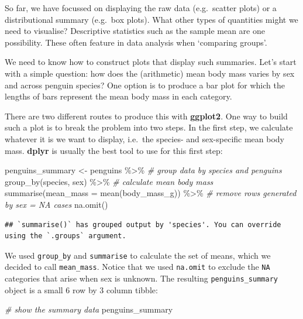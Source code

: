 \documentclass[
]{book}
\newenvironment{Shaded}{\begin{snugshade}}{\end{snugshade}}
\newcommand{\AttributeTok}[1]{\textcolor[rgb]{0.77,0.63,0.00}{#1}}
\newcommand{\CommentTok}[1]{\textcolor[rgb]{0.56,0.35,0.01}{\textit{#1}}}
\newcommand{\FunctionTok}[1]{\textcolor[rgb]{0.00,0.00,0.00}{#1}}
\newcommand{\NormalTok}[1]{#1}
\newcommand{\OtherTok}[1]{\textcolor[rgb]{0.56,0.35,0.01}{#1}}
\newcommand{\SpecialCharTok}[1]{\textcolor[rgb]{0.00,0.00,0.00}{#1}}
\begin{document}
So far, we have focussed on displaying the raw data (e.g.~scatter plots) or a distributional summary (e.g.~box plots). What other types of quantities might we need to visualise? Descriptive statistics such as the sample mean are one possibility. These often feature in data analysis when `comparing groups'.

We need to know how to construct plots that display such summaries. Let's start with a simple question: how does the (arithmetic) mean body mass varies by sex and across penguin species? One option is to produce a bar plot for which the lengths of bars represent the mean body mass in each category.

There are two different routes to produce this with \textbf{ggplot2}. One way to build such a plot is to break the problem into two steps. In the first step, we calculate whatever it is we want to display, i.e.~the species- and sex-specific mean body mass. \textbf{dplyr} is usually the best tool to use for this first step:

\begin{Shaded}
\begin{Highlighting}[]
\NormalTok{penguins\_summary }\OtherTok{\textless{}{-}}\NormalTok{ penguins }\SpecialCharTok{\%\textgreater{}\%} 
  \CommentTok{\# group data by species and penguins}
  \FunctionTok{group\_by}\NormalTok{(species, sex) }\SpecialCharTok{\%\textgreater{}\%} 
  \CommentTok{\# calculate mean body mass}
  \FunctionTok{summarise}\NormalTok{(}\AttributeTok{mean\_mass =} \FunctionTok{mean}\NormalTok{(body\_mass\_g)) }\SpecialCharTok{\%\textgreater{}\%} 
  \CommentTok{\# remove rows generated by sex = NA cases}
  \FunctionTok{na.omit}\NormalTok{()}
\end{Highlighting}
\end{Shaded}

\begin{verbatim}
## `summarise()` has grouped output by 'species'. You can override using the `.groups` argument.
\end{verbatim}

We used \texttt{group\_by} and \texttt{summarise} to calculate the set of means, which we decided to call \texttt{mean\_mass}. Notice that we used \texttt{na.omit} to exclude the \texttt{NA} categories that arise when sex is unknown. The resulting \texttt{penguins\_summary} object is a small 6 row by 3 column tibble:

\begin{Shaded}
\begin{Highlighting}[]
\CommentTok{\# show the summary data}
\NormalTok{penguins\_summary}
\end{Highlighting}
\end{Shaded}
\end{document}
